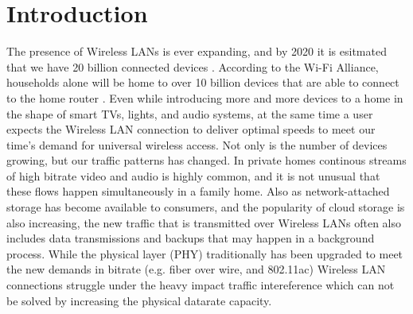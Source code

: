 \chapter{Introduction}
The presence of Wireless LANs is ever expanding, and by 2020 it is esitmated that we have 20 billion connected devices \cite{Gartner}.
According to the Wi-Fi Alliance, households alone will be home to over 10 billion devices that are able to connect to
the home router \cite{wifialliance}. 
Even while introducing more and more devices to a home in the shape of smart TVs, lights, and audio systems, at the same time
a user expects the Wireless LAN connection to deliver optimal speeds to meet our time's demand for universal wireless access. 
Not only is the number of devices growing, but our traffic patterns has changed. In private homes
continous streams of high bitrate video and audio is highly common, and it is not unusual that these flows happen
simultaneously in a family home. Also as network-attached storage has become available to consumers,
and the popularity of cloud storage is also increasing, the new traffic that is transmitted over Wireless LANs
often also includes data transmissions and backups that may happen in a background process. 
While the physical layer (PHY) traditionally has been upgraded to meet the new demands in bitrate (e.g. fiber over wire, 
and 802.11ac) Wireless LAN connections struggle under the heavy impact traffic intereference which can not be solved by increasing
the physical datarate capacity. 


